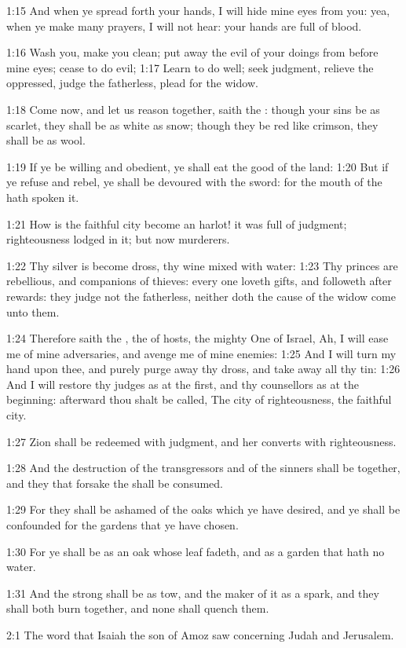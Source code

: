 1:15 And when ye spread forth your hands, I will hide mine eyes from
you: yea, when ye make many prayers, I will not hear: your hands are
full of blood.

1:16 Wash you, make you clean; put away the evil of your doings from
before mine eyes; cease to do evil; 1:17 Learn to do well; seek
judgment, relieve the oppressed, judge the fatherless, plead for the
widow.

1:18 Come now, and let us reason together, saith the \LORD: though your
sins be as scarlet, they shall be as white as snow; though they be red
like crimson, they shall be as wool.

1:19 If ye be willing and obedient, ye shall eat the good of the land:
1:20 But if ye refuse and rebel, ye shall be devoured with the sword:
for the mouth of the \LORD hath spoken it.

1:21 How is the faithful city become an harlot! it was full of
judgment; righteousness lodged in it; but now murderers.

1:22 Thy silver is become dross, thy wine mixed with water: 1:23 Thy
princes are rebellious, and companions of thieves: every one loveth
gifts, and followeth after rewards: they judge not the fatherless,
neither doth the cause of the widow come unto them.

1:24 Therefore saith the \LORD, the \LORD of hosts, the mighty One of
Israel, Ah, I will ease me of mine adversaries, and avenge me of mine
enemies: 1:25 And I will turn my hand upon thee, and purely purge away
thy dross, and take away all thy tin: 1:26 And I will restore thy
judges as at the first, and thy counsellors as at the beginning:
afterward thou shalt be called, The city of righteousness, the
faithful city.

1:27 Zion shall be redeemed with judgment, and her converts with
righteousness.

1:28 And the destruction of the transgressors and of the sinners shall
be together, and they that forsake the \LORD shall be consumed.

1:29 For they shall be ashamed of the oaks which ye have desired, and
ye shall be confounded for the gardens that ye have chosen.

1:30 For ye shall be as an oak whose leaf fadeth, and as a garden that
hath no water.

1:31 And the strong shall be as tow, and the maker of it as a spark,
and they shall both burn together, and none shall quench them.

2:1 The word that Isaiah the son of Amoz saw concerning Judah and
Jerusalem.

